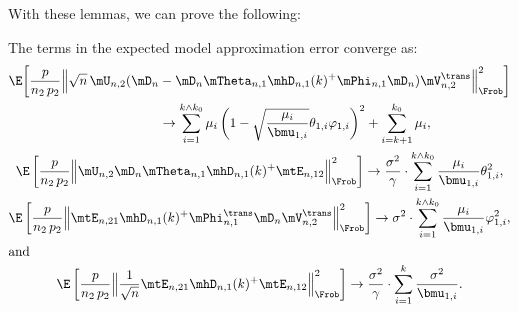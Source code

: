 With these lemmas, we can prove the following:

\begin{lemma}
	The terms in the expected model approximation error converge as:
	\begin{gather*}
		\begin{split}
		\E\bigg[ 
			\frac{p}{n_2 \, p_2} 
			\Big\|
				\sqrt{n} \,
				\mU_{n,2} 
				( 
					\mD_n 
					&- 
					\mD_n 
					\mTheta_{n,1} \mhD_{n,1}(k)^+ \mPhi_{n,1}
					\mD_n
				)
				\mV_{n,2}^\trans 
			\Big\|_\Frob^2
		\bigg] \\
			&\to 
			 	\sum_{i=1}^{k \wedge k_0}
					\mu_i 
					\left( 
						1 
						- 
						\sqrt{ \frac{ \mu_i }{ \bmu_{1,i} } }
						\theta_{1,i}
						\varphi_{1,i}
					\right)^2
				+
				\sum_{i=k+1}^{k_0}
					\mu_i,
		\end{split}\\
		\E\left[ 
			\frac{p}{n_2 \, p_2} 
			\Big\|
				\mU_{n,2} 
				\mD_n \mTheta_{n,1} \mhD_{n,1}(k)^+ 
				\mtE_{n,12}
			\Big\|_\Frob^2
		\right]
			\to
				\frac{\sigma^2}{\gamma}
				\cdot 
				\sum_{i=1}^{k \wedge k_0}
					\frac{\mu_i}{\bmu_{1,i}}
					\theta_{1,i}^2,
				\\
		\E\left[ 
			\frac{p}{n_2 \, p_2} 
			\Big\|
				\mtE_{n,21}
				\mhD_{n,1}(k)^+ \mPhi_{n,1}^\trans \mD_n 
				\mV_{n,2}^\trans
			\Big\|_\Frob^2
		\right]
			\to
				\sigma^2
				\cdot
				\sum_{i=1}^{k \wedge k_0} 
					\frac{\mu_i}{\bmu_{1,i}}
					\varphi_{1,i}^2,
				\\
\intertext{and}
		\E\left[ 
			\frac{p}{n_2 \, p_2} 
			\Big\|
				\frac{1}{\sqrt{n}}
				\mtE_{n,21}
				\mhD_{n,1}(k)^+
				\mtE_{n,12}
			\Big\|_\Frob^2
		\right]
			\to
				\frac{\sigma^2}{\gamma}
				\cdot
				\sum_{i=1}^k
					\frac{\sigma^2}{\bmu_{1,i}}.
	\end{gather*}
\end{lemma}

